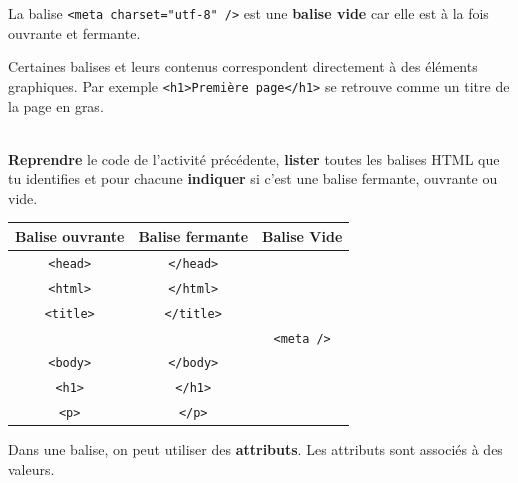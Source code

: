 \documentclass[a4paper,17pt]{extarticle}
\newenvironment{eleve}%
{\begin{activite}\color{noiramu}\\}
{\end{activite}}
\begin{document}
La balise \texttt{\textless{}meta\ charset="utf-8"\ /\textgreater{}} est
une \textbf{balise vide} car elle est à la fois ouvrante et fermante.

Certaines balises et leurs contenus correspondent directement à des
éléments graphiques. Par exemple
\texttt{\textless{}h1\textgreater{}Première\ page\textless{}/h1\textgreater{}}
se retrouve comme un titre de la page en gras.
\begin{eleve}
    \textbf{Reprendre} le code de l'activité précédente, \textbf{lister}
toutes les balises HTML que tu identifies et pour chacune
\textbf{indiquer} si c'est une balise fermante, ouvrante ou vide.
        
        \end{eleve}\begin{reponse}
    \begin{longtable}[]{@{}ccc@{}}
\toprule
Balise ouvrante & Balise fermante & Balise Vide\tabularnewline
\midrule
\endhead
\texttt{\textless{}head\textgreater{}} &
\texttt{\textless{}/head\textgreater{}} &\tabularnewline
\texttt{\textless{}html\textgreater{}} &
\texttt{\textless{}/html\textgreater{}} &\tabularnewline
\texttt{\textless{}title\textgreater{}} &
\texttt{\textless{}/title\textgreater{}} &\tabularnewline
& & \texttt{\textless{}meta\ /\textgreater{}}\tabularnewline
\texttt{\textless{}body\textgreater{}} &
\texttt{\textless{}/body\textgreater{}} &\tabularnewline
\texttt{\textless{}h1\textgreater{}} &
\texttt{\textless{}/h1\textgreater{}} &\tabularnewline
\texttt{\textless{}p\textgreater{}} &
\texttt{\textless{}/p\textgreater{}} &\tabularnewline
\bottomrule
\end{longtable}

            \end{reponse}
    Dans une balise, on peut utiliser des \textbf{attributs}. Les attributs
sont associés à des valeurs.
\end{document}

